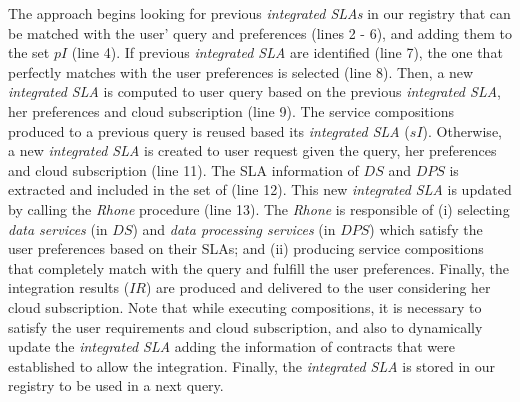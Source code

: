 The approach begins looking for previous \textit{integrated SLAs} in our registry that can be matched with the user' query and preferences (lines 2 - 6), and adding them to the set $pI$ (line 4). 
%
If previous \textit{integrated SLA} are identified (line 7), the one that perfectly matches with the user preferences is selected (line 8). 
%
Then, a new \textit{integrated SLA} is computed to user query based on the previous \textit{integrated SLA}, her preferences and cloud subscription (line 9). 
%
The service compositions produced to a previous query is reused based its \textit{integrated SLA} ($sI$). 
%
Otherwise, a new \textit{integrated SLA} is created to user request given the query, her preferences and cloud subscription (line 11). 
%
The SLA information of $\mathit{DS}$ and $\mathit{DPS}$ is extracted and included in the set of \bigS (line 12). 
%
This new \textit{integrated SLA} is updated by calling the \textit{Rhone} procedure (line 13). 
%
The \textit{Rhone} is responsible of (i) selecting \textit{data services} (in $DS$) and \textit{data processing services} (in $DPS$) which satisfy the user preferences based on their SLAs; and (ii) producing service compositions that completely match with the query and fulfill the user preferences. 
%
Finally, the integration results ($IR$) are produced and delivered to the user considering her cloud subscription. 
%
Note that while executing compositions, it is necessary to satisfy the user requirements and cloud subscription, and also to dynamically update the \textit{integrated SLA} adding the information of contracts that were established to allow the integration. 
%
Finally, the \textit{integrated SLA} is stored in our registry to be used in a next query.   

